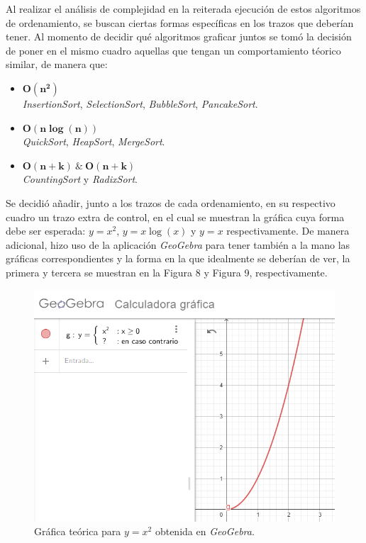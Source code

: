 \documentclass[a4paper,12pt]{article}
\begin{document}
Al realizar el análisis de complejidad en la reiterada ejecución de estos algoritmos de ordenamiento, se buscan ciertas formas específicas en los trazos que deberían tener. Al momento de decidir qué algoritmos graficar juntos se tomó la decisión de poner en el mismo cuadro aquellas que tengan un comportamiento téorico similar, de manera que:

\begin{itemize}
    \item $\mathbf{O(n^2)}$ \\\textit{InsertionSort}, \textit{SelectionSort}, \textit{BubbleSort}, \textit{PancakeSort}.
    \item $\mathbf{O(n\log(n))}$ \\\textit{QuickSort}, \textit{HeapSort}, \textit{MergeSort}.
    \item $\mathbf{O(n+k) \ \& \ O(n+k)}$ \\\textit{CountingSort} y \textit{RadixSort}.
\end{itemize}

Se decidió añadir, junto a los trazos de cada ordenamiento, en su respectivo cuadro un trazo extra de control, en el cual se muestran la gráfica cuya forma debe ser esperada: $y=x^2$, $y=x\log(x)$ y $y=x$ respectivamente. De manera adicional, hizo uso de la aplicación \textit{GeoGebra} para tener también a la mano las gráficas correspondientes y la forma en la que idealmente se deberían de ver, la primera y tercera se muestran en la Figura 8 y Figura 9, respectivamente.

\begin{figure}[H]
    \centering
    \includegraphics[width=.9\textwidth]{media/semiparabola-geogebra.png}
    \caption{Gráfica teórica para $y=x^2$ obtenida en \textit{GeoGebra}.\cite{geogebra}}
    \label{fig:semiparabola-geogebra}
\end{figure}
\end{document}
